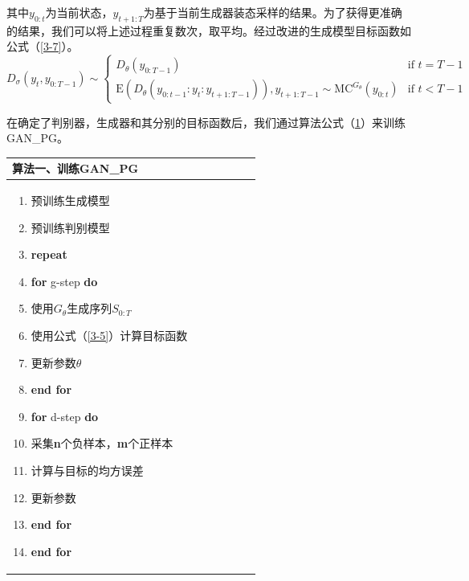 其中$y_{0:t}$为当前状态，$y_{t+1:T}$为基于当前生成器装态采样的结果。为了获得更准确的结果，我们可以将上述过程重复数次，取平均。经过改进的生成模型目标函数如公式（\ref{3-7}）。
\begin{equation}\label{3-7}
D_\sigma(y_t,y_{0:T-1})\sim 
\begin{cases}
    D_\theta(y_{0:T-1}) & \text{if } t =T-1 \\
    \mathrm{E}(D_\theta(y_{0:t-1}:y_t:y_{t+1:T-1})),y_{t+1:T-1}\sim \mathrm{MC}^{G_\theta}(y_{0:t}) & \text{if }t<T-1
\end{cases}
\end{equation}

在确定了判别器，生成器和其分别的目标函数后，我们通过算法公式（\ref{s3-1}）来训练GAN\_PG。
\begin{table}[htbp]
    \label{s3-1}
    \begin{center}
        \begin{tabular*}{.75\linewidth}{p{0.75\linewidth}}
\toprule
            算法一、训练GAN\_PG \\
\midrule
\begin{minipage}[t]{\linewidth}
\begin{enumerate}[itemsep=-10pt]
    \item 预训练生成模型
    \item 预训练判别模型
    \item \textbf{repeat}
    \item \quad \textbf{for} g-step \textbf{do}
    \item \quad \quad 使用$G_\theta$生成序列$S_{0:T}$
    \item \quad \quad 使用公式（\ref{3-5}）计算目标函数
    \item \quad \quad 更新参数$\theta$
    \item \quad \textbf{end for}
    \item \quad \textbf{for} d-step \textbf{do}
    \item \quad \quad 采集\textbf{n}个负样本，\textbf{m}个正样本
    \item \quad \quad 计算与目标的均方误差
    \item \quad \quad 更新参数
    \item \quad \textbf{end for}  
    \item \textbf{end for}
\end{enumerate}
\end{minipage}\\
\bottomrule
        \end{tabular*}
    \end{center}
\end{table}

